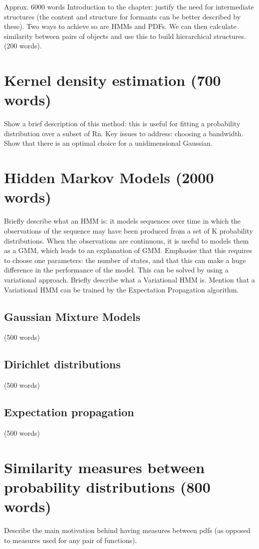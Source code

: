 \documentclass[../main.tex]{subfiles}
\begin{document}
 \label{chapter_hmms}
Approx. 6000 words
Introduction to the chapter: justify the need for intermediate structures (the content and structure for formants can be better described by these). Two ways to achieve so are HMMs and PDFs. We can then calculate similarity between pairs of objects and use this to build hierarchical structures. (200 words).

\section{ Kernel density estimation  (700 words)}
Show a brief description of this method: this is useful for fitting a probability distribution over a subset of Rn. Key issues to address: choosing a bandwidth. Show that there is an optimal choice for a unidimensional Gaussian.
\section{ Hidden Markov Models (2000 words)}
Briefly describe what an HMM is: it models sequences over time in which the observations of the sequence may have been produced from a set of K probability distributions. When the observations are continuous, it is useful to models them as a GMM, which leads to an explanation of GMM. Emphasise that this requires to choose one parameters: the number of states, and that this can make a huge difference in the performance of the model. This can be solved by using a variational approach. Briefly describe what a Variational HMM is. Mention that a Variational HMM can be trained by the Expectation Propagation algorithm.
\subsection{ Gaussian Mixture Models } (500 words)
\subsection{ Dirichlet distributions } (500 words)
\subsection{ Expectation propagation } (500 words)
\section{ Similarity measures between probability distributions (800 words)}
Describe the main motivation behind having measures between pdfs (as opposed to measures used for any pair of functions).
\end{document}
